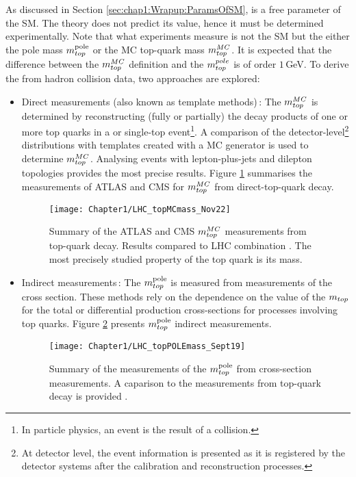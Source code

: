 As discussed in Section \ref{sec:chap1:Wrapup:ParamsOfSM}, \mtop is a free parameter 
of the SM. The theory does not predict its value, hence it must be determined experimentally. 
Note that what experiments measure is not the SM \mtop but the either the pole mass $m_{top}^{\text{pole}}$ or
the MC top-quark mass $m_{top}^{MC}$. It is expected that the difference between the $m_{top}^{MC}$ definition 
and the $m_{top}^{pole}$ is of order $1\,$GeV. %
To derive the \mtop from hadron collision data, two approaches are explored:
\begin{itemize}
	\item Direct measurements (also known as template methods)$\,$\cite{Amoroso:2746800}:
	 The $m_{top}^{MC}$ is determined by reconstructing
	 (fully or partially) the decay products of one or more top quarks in a \ttbar or single-top event\footnote{In 
	 particle physics, an event is the result of a collision.}. A comparison of
	  the detector-level\footnote{ At detector level, the event information is presented as it is 
	  registered by the detector systems after the calibration and reconstruction processes.}
	  distributions with templates created with a MC generator is used to determine $m_{top}^{MC}$.
	  Analysing \ttbar events with lepton-plus-jets and dilepton topologies provides the most precise results.
	  Figure \ref{fig:Chap1:top:mtop_MC} summarises the measurements of ATLAS 
	  and CMS for $m_{top}^{MC}$ from direct-top-quark decay.
	  
	\begin{figure}
    	\centering
    	\texttt{[image: Chapter1/LHC\_topMCmass\_Nov22]}
   	 \caption{Summary of the ATLAS and CMS $m_{top}^{MC}$ measurements from top-quark decay. 
	 Results compared to LHC \mtop combination \cite{ATLAS:2022lsz}. 
	 The most precisely studied property of the top quark is its mass.}
    	\label{fig:Chap1:top:mtop_MC}
	\end{figure}

	
       \item Indirect measurements$\,$\cite{Amoroso:2746800}:
	The $m_{top}^{\text{pole}}$ is measured from measurements of the cross section. These methods
	rely on the dependence on the value of the $m_{top}$ for the total or differential production 
	cross-sections for processes involving top quarks. Figure \ref{fig:Chap1:top:mtop_Pole}
	presents $m_{top}^{\text{pole}}$ indirect measurements.
	\begin{figure}
    	\centering
    	\texttt{[image: Chapter1/LHC\_topPOLEmass\_Sept19]}
    	\caption{Summary of the measurements of the $m_{top}^{\text{pole}}$ from \ttbar cross-section measurements.
    	A caparison to the measurements from top-quark decay is provided \cite{ATLAS:2018fwq}.}
    	\label{fig:Chap1:top:mtop_Pole}
	\end{figure}
	\end{itemize} 	


